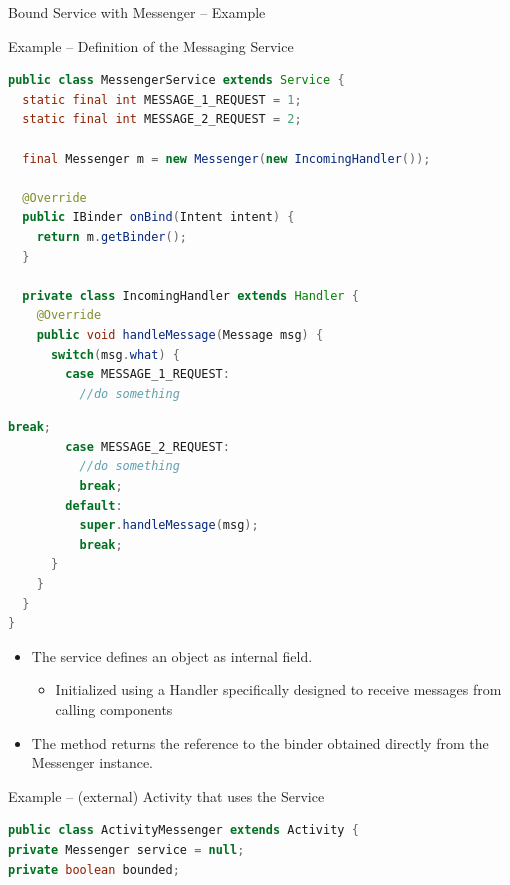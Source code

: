\documentclass{beamer}
\begin{document}
  \begin{frame}{Bound Service with Messenger -- Example}
    \begin{exampleblock}{Example -- Definition of the Messaging Service}
      \begin{lstlisting}[language=Java]
public class MessengerService extends Service {
  static final int MESSAGE_1_REQUEST = 1;
  static final int MESSAGE_2_REQUEST = 2;
  
  final Messenger m = new Messenger(new IncomingHandler());
  
  @Override
  public IBinder onBind(Intent intent) {
    return m.getBinder();
  }

  private class IncomingHandler extends Handler {
    @Override
    public void handleMessage(Message msg) {
      switch(msg.what) {
        case MESSAGE_1_REQUEST:
          //do something
      \end{lstlisting}
    \end{exampleblock}  
    \begin{exampleblock}{\vspace{-10pt}}
      \begin{lstlisting}[language=Java]
          break;
        case MESSAGE_2_REQUEST:
          //do something
          break;
        default:
          super.handleMessage(msg);
          break;
      }
    }
  }
}
      \end{lstlisting}
    \end{exampleblock}

    \begin{itemize}
      \item The service defines an  object as internal
      field.
      \begin{itemize}
        \item Initialized using a Handler specifically designed to receive
        messages from calling components
      \end{itemize}
      \item The  method returns the reference to the binder
      obtained directly from the Messenger instance.
    \end{itemize}

    \begin{exampleblock}{Example -- (external) Activity that uses the Service}
      \begin{lstlisting}[language=Java]
public class ActivityMessenger extends Activity {
private Messenger service = null;
private boolean bounded;


\end{lstlisting}
\end{exampleblock}
\end{frame}
\end{document}
